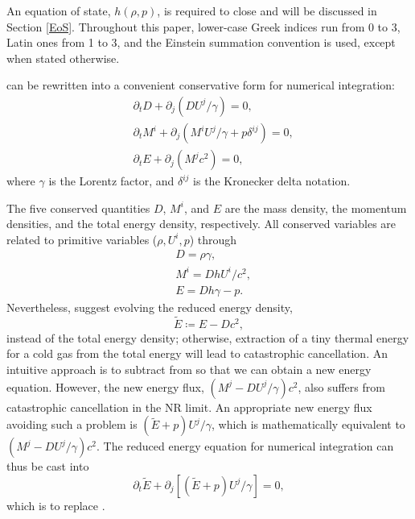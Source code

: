 \documentclass[twocolumn]{aastex63}
\begin{document}
An equation of state, $h\left(\rho, p\right)$, is required to close  and will be discussed in Section \ref{EoS}.
Throughout this paper, lower-case Greek indices run from 0 to 3, Latin ones from 1 to 3, and the Einstein summation convention is used, except when stated otherwise.

 can be rewritten into a convenient conservative form for numerical integration:
\begin{subequations}
  \label{conservative form}
  \begin{align}
   &\partial_{t} D+\partial_{j} \left(DU^{j}/\gamma\right)=0,\label{D evolution}\\
   &\partial_{t}M^{i}+\partial_{j} \left(M^{i}U^{j}/\gamma+p\delta^{ij}\right)=0,\label{M evolution}\\
   &\partial_t E+\partial_j  \left(M^{j}c^2\right)=0, \label{E evoltion}
  \end{align}
\end{subequations}
where $\gamma$ is the Lorentz factor, and $\delta^{ij}$ is the Kronecker delta notation.

The five conserved quantities $D$, $M^{i}$, and $E$ are the mass density, the momentum densities, and the total energy density, respectively. All conserved variables are related to primitive variables ($\rho, U^{i}, p$) through
\begin{subequations}
  \begin{align}
    &D=\rho\gamma,\label{density}\\
    &M^{i}=Dh U^{i} /c^2,\label{momentum}\\
    &E=D h\gamma-p. \label{definition of reduced energy}
  \end{align}
  \label{relation between prim and cons}
\end{subequations}
Nevertheless, \cite{NR_Limit} suggest evolving the reduced energy density,
\begin{equation}
\tilde{E} \coloneqq E-Dc^2, \label{ETilde}
\end{equation}
instead of the total energy density; otherwise, extraction of a tiny thermal energy for a cold gas from the total energy will lead to catastrophic cancellation. An intuitive approach is to subtract  from  so that we can obtain a new energy equation. However, the new energy flux, $\left(M^{j}-DU^{j}/\gamma\right)c^2$, also suffers from catastrophic cancellation in the NR limit. An appropriate new energy flux avoiding such a problem is $(\tilde{E}+p)U^{j}/\gamma$, which is mathematically equivalent to $\left(M^{j}-DU^{j}/\gamma\right)c^2$. The reduced energy equation for numerical integration can thus be cast into
\begin{equation}
    \partial_t \tilde{E}+\partial_j \left[\left(\tilde{E}+p\right)U^{j}/\gamma\right]=0,
    \label{ETilde evolution}
\end{equation}
which is to replace .
\end{document}
